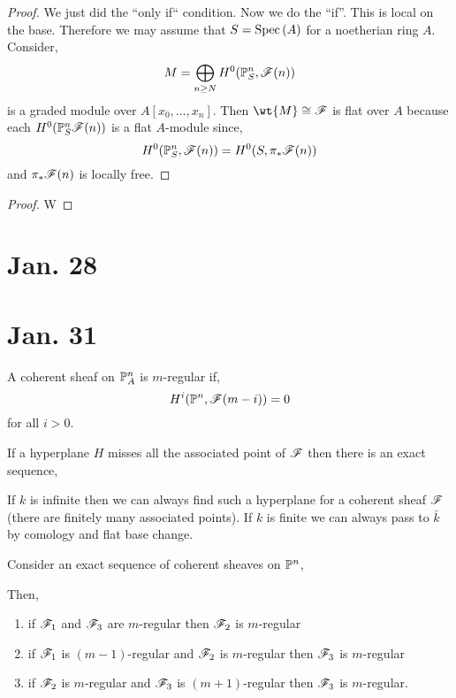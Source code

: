 \documentclass[12pt]{article}
\begin{document}
\begin{proof}
We just did the ``only if`` condition. Now we do the ``if''.
This is local on the base. Therefore we may assume that $S = \Spec{A}$ for a noetherian ring $A$. 
\bigskip\\
Consider,
\[ M = \bigoplus_{n \ge N} H^0(\P^n_S, \F(n)) \]
is a graded module over $A[x_0, \dots, x_n]$. Then $\wt{M} \cong \F$ is flat over $A$ because each $H^0(\P^n_S \F(n))$ is a flat $A$-module since,
\[ H^0(\P^n_S, \F(n)) = H^0(S, \pi_* \F(n)) \]
and $\pi_* \F(n)$ is locally free. 
\end{proof}

\begin{proof}
W
\end{proof}

\section{Jan. 28}

\section{Jan. 31}

\begin{defn}
A coherent sheaf on $\P^n_A$ is $m$-regular if,
\[ H^i(\P^n, \F(m-i)) = 0 \]
for all $i > 0$.
\end{defn}

\begin{prop}
If a hyperplane $H$ misses all the associated point of $\F$ then there is an exact sequence,
\begin{center}
\end{center}
\end{prop}

\begin{rmk}
If $k$ is infinite then we can always find such a hyperplane for a coherent sheaf $\F$ (there are finitely many associated points). If $k$ is finite we can always pass to $\bar{k}$ by comology and flat base change. 
\end{rmk}

\begin{prop}
Consider an exact sequence of coherent sheaves on $\P^n$,
\begin{center}
\end{center}
Then,
\begin{enumerate}
\item if $\F_1$ and $\F_3$ are $m$-regular then $\F_2$ is $m$-regular
\item if $\F_1$ is $(m-1)$-regular and $\F_2$ is $m$-regular then $\F_3$ is $m$-regular
\item if $\F_2$ is $m$-regular and $\F_3$ is $(m+1)$-regular then $\F_3$ is $m$-regular. 
\end{enumerate}
\end{prop}
\end{document}

